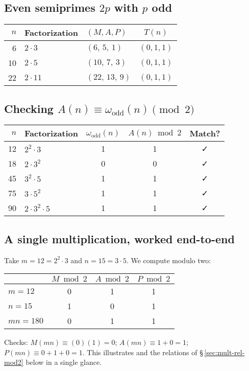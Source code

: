 \documentclass[11pt,a4paper]{article}
\numberwithin{equation}{section}
\numberwithin{figure}{section}
\numberwithin{table}{section}
\theoremstyle{plain}
\theoremstyle{definition}
\theoremstyle{remark}
\begin{document}
\subsection*{Even semiprimes \(2p\) with \(p\) odd}
\begin{center}
\begin{tabular}{r l l c}
\toprule
\(n\) & Factorization & \((M,A,P)\) & \(T(n)\) \\
\midrule
6   & \(2\cdot 3\)   & \((6,\,5,\,1)\)  & \((0,1,1)\) \\
10  & \(2\cdot 5\)   & \((10,\,7,\,3)\) & \((0,1,1)\) \\
22  & \(2\cdot 11\)  & \((22,\,13,\,9)\) & \((0,1,1)\) \\
\bottomrule
\end{tabular}
\end{center}

\subsection*{Checking \(A(n)\equiv \omega_{\mathrm{odd}}(n)\pmod 2\)}
\begin{center}
\begin{tabular}{r l c c c}
\toprule
\(n\) & Factorization & \(\omega_{\mathrm{odd}}(n)\) & \(A(n)\bmod 2\) & Match? \\
\midrule
12 & \(2^2\cdot 3\)       & 1 & 1 & ✓ \\
18 & \(2\cdot 3^2\)       & 0 & 0 & ✓ \\
45 & \(3^2\cdot 5\)       & 1 & 1 & ✓ \\
75 & \(3\cdot 5^2\)       & 1 & 1 & ✓ \\
90 & \(2\cdot 3^2\cdot 5\) & 1 & 1 & ✓ \\
\bottomrule
\end{tabular}
\end{center}

\subsection*{A single multiplication, worked end-to-end}
Take \(m=12=2^2\cdot 3\) and \(n=15=3\cdot 5\). We compute modulo two:
\begin{center}
\begin{tabular}{l c c c}
\toprule
 & \(M\bmod 2\) & \(A\bmod 2\) & \(P\bmod 2\) \\
\midrule
\(m=12\) & 0 & 1 & 1 \\
\(n=15\) & 1 & 0 & 1 \\
\(mn=180\) & 0 & 1 & 1 \\
\bottomrule
\end{tabular}
\end{center}
Checks: \(M(mn)\equiv (0)(1)=0\); \(A(mn)\equiv 1+0=1\); \(P(mn)\equiv 0+1+0=1\). This illustrates  and the relations of \S\,\ref{sec:mult-rel-mod2} below in a single glance.
\end{document}
